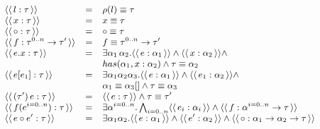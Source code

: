 \documentclass[a4paper,8pt]{article}
\newcommand{\constr}[1]{\ensuremath{\langle\langle\,#1\,\rangle\rangle}}
\begin{document}
     \begin{figure}[H]
       \[\small{
            \begin{array}{lcl}
                \constr{l : \tau} & = & \rho(l) \equiv \tau\\
                \constr{x : \tau} & = & x \equiv \tau \\
                \constr{\circ : \tau} & = & \circ \equiv \tau \\
                \constr{f : \tau^{0..n}\to \tau'} & = & f \equiv
                                                        \tau^{0..n}\to
                                                        \tau' \\
                \constr{e.x : \tau} & = & \exists
                                          \alpha_1\,\alpha_2. \constr{e
                                          : \alpha_1} \land \constr{x
                                          : \alpha_2} \land \\
                          & & has(\alpha_1,x:\alpha_2) \land \tau
                              \equiv \alpha_2\\
                \constr{e[e_1] : \tau} & = & \exists
                                         \alpha_1\alpha_2\alpha_3. \constr{e:\alpha_1}
                                             \land\constr{e_1:\alpha_2}\land\\
                         & & \alpha_1\equiv\alpha_3[]\land \tau \equiv
                             \alpha_3\\
                \constr{(\tau')\,e:\tau} & = & \constr{e : \tau} \land
                                               \tau \equiv \tau'\\
                \constr{f(e^{i=0..n}) : \tau} & = & \exists
                                                    \alpha^{i=0..n}. \bigwedge_{i=0..n}\constr{e_i:\alpha_i}
                                                    \land \constr{f :
                                                    \alpha^{i=0..n}
                                                    \to \tau} \\
                     \constr{e \circ e' : \tau} & = & \exists
                                                      \alpha_1\alpha_2.\constr{e
                                                      :\alpha_1} \land
                                                      \constr{e' :
                                                      \alpha_2} \land
                                                      \constr{\circ :
                                                      \alpha_1\to\alpha_2\to\tau}\\

\end{array}}\]
\end{figure}
\end{document}
